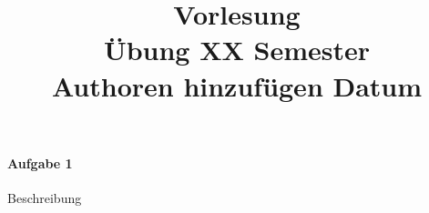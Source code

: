 \documentclass[a4paper]{paper}
\title{\Huge{Vorlesung}\\
\normalsize{
    \textcolor{ITSecColor}{Übung XX}}
    \hfill{Semester}\\
    Authoren hinzufügen
    \hfill{Datum}
}
\begin{document}
\maketitle


\paragraph{Aufgabe 1} Beschreibung
\\ \lipsum[1]

\newpage
\lipsum[2]
\end{document}
